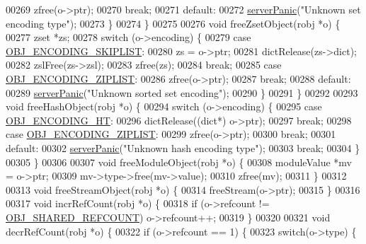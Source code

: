 \begin{DoxyCode}
00269         zfree(o->ptr);
00270         \textcolor{keywordflow}{break};
00271     \textcolor{keywordflow}{default}:
00272         \hyperlink{server_8h_a11cc378e7778a830b41240578de3b204}{serverPanic}(\textcolor{stringliteral}{"Unknown set encoding type"});
00273     \}
00274 \}
00275 
00276 \textcolor{keywordtype}{void} freeZsetObject(robj *o) \{
00277     zset *zs;
00278     \textcolor{keywordflow}{switch} (o->encoding) \{
00279     \textcolor{keywordflow}{case} \hyperlink{server_8h_acfb35db5cb30ed113ed23aeb1a224c4c}{OBJ\_ENCODING\_SKIPLIST}:
00280         zs = o->ptr;
00281         dictRelease(zs->dict);
00282         zslFree(zs->zsl);
00283         zfree(zs);
00284         \textcolor{keywordflow}{break};
00285     \textcolor{keywordflow}{case} \hyperlink{server_8h_aabf064ede983103f1fd0df2086e84eee}{OBJ\_ENCODING\_ZIPLIST}:
00286         zfree(o->ptr);
00287         \textcolor{keywordflow}{break};
00288     \textcolor{keywordflow}{default}:
00289         \hyperlink{server_8h_a11cc378e7778a830b41240578de3b204}{serverPanic}(\textcolor{stringliteral}{"Unknown sorted set encoding"});
00290     \}
00291 \}
00292 
00293 \textcolor{keywordtype}{void} freeHashObject(robj *o) \{
00294     \textcolor{keywordflow}{switch} (o->encoding) \{
00295     \textcolor{keywordflow}{case} \hyperlink{server_8h_a9c10219f68afc557d510d108257d238b}{OBJ\_ENCODING\_HT}:
00296         dictRelease((dict*) o->ptr);
00297         \textcolor{keywordflow}{break};
00298     \textcolor{keywordflow}{case} \hyperlink{server_8h_aabf064ede983103f1fd0df2086e84eee}{OBJ\_ENCODING\_ZIPLIST}:
00299         zfree(o->ptr);
00300         \textcolor{keywordflow}{break};
00301     \textcolor{keywordflow}{default}:
00302         \hyperlink{server_8h_a11cc378e7778a830b41240578de3b204}{serverPanic}(\textcolor{stringliteral}{"Unknown hash encoding type"});
00303         \textcolor{keywordflow}{break};
00304     \}
00305 \}
00306 
00307 \textcolor{keywordtype}{void} freeModuleObject(robj *o) \{
00308     moduleValue *mv = o->ptr;
00309     mv->type->free(mv->value);
00310     zfree(mv);
00311 \}
00312 
00313 \textcolor{keywordtype}{void} freeStreamObject(robj *o) \{
00314     freeStream(o->ptr);
00315 \}
00316 
00317 \textcolor{keywordtype}{void} incrRefCount(robj *o) \{
00318     \textcolor{keywordflow}{if} (o->refcount != \hyperlink{server_8h_a1dc2a137875b0c8ee0fa1df43684a7b8}{OBJ\_SHARED\_REFCOUNT}) o->refcount++;
00319 \}
00320 
00321 \textcolor{keywordtype}{void} decrRefCount(robj *o) \{
00322     \textcolor{keywordflow}{if} (o->refcount == 1) \{
00323         \textcolor{keywordflow}{switch}(o->type) \{

\end{DoxyCode}
